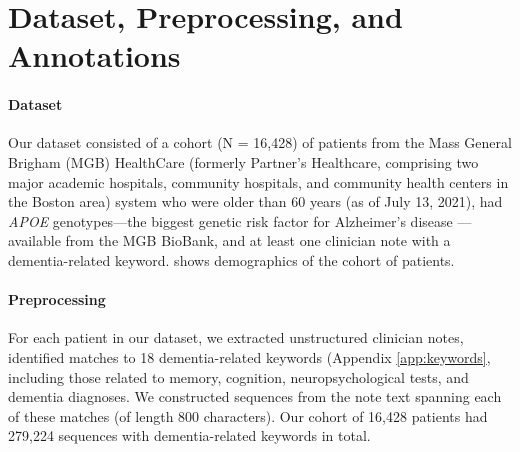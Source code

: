 \documentclass[pmlr,twocolumn,10pt]{jmlr} %
\begin{document}
\section{Dataset, Preprocessing, and Annotations}
\label{sec:Dataset+Preprocessing+Annotations}

\paragraph{Dataset}
\label{sec:Dataset} Our dataset consisted of a cohort (N = 16,428) of patients from the Mass General Brigham (MGB) HealthCare \citep{jpm6010011} (formerly Partner's Healthcare, comprising two major academic hospitals, community hospitals, and community health centers in the Boston area) system who were older than 60 years (as of July 13, 2021), had \textit{APOE} genotypes—the biggest genetic risk factor for Alzheimer's disease  \citep{mahley2000apolipoprotein}—available from the MGB BioBank, and at least one clinician note with a dementia-related keyword.  shows demographics of the cohort of patients.   

\paragraph{Preprocessing}
\label{sec:Preprocessing} For each patient in our dataset, we extracted unstructured clinician notes, identified matches to 18 dementia-related keywords (Appendix \ref{app:keywords}, including those related to memory, cognition, neuropsychological tests, and dementia diagnoses. We constructed sequences from the note text spanning each of these matches (of length 800 characters). Our cohort of 16,428 patients had 279,224 sequences with dementia-related keywords in total.
\end{document}
